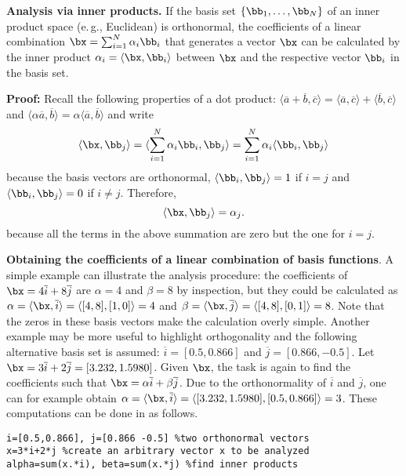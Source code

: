 \bTheorem \textbf{Analysis via inner products.\label{th:analysis_inner_prod}} If the basis set $\{\bb_1, \ldots, \bb_N \}$ of an inner product space (e.\,g., Euclidean) is orthonormal, the coefficients of a linear combination $\bx=\sum_{i=1}^N \alpha_i \bb_i$ that generates a vector $\bx$ can be calculated by the inner product $\alpha_i = \langle\bx,\bb_i\rangle$ between $\bx$ and the respective vector $\bb_i$ in the basis set.

\textbf{Proof:} Recall the following properties of a dot product: $\langle\overline a+\overline b , \overline c\rangle = \langle\overline a , \overline c\rangle + \langle\overline b , \overline c\rangle$ and $\langle\alpha \overline a ,\overline b\rangle = \alpha \langle\overline a ,\overline b\rangle$ and
write
\[
\langle\bx,\bb_j\rangle=\langle\sum_{i=1}^N \alpha_i \bb_i,\bb_j\rangle = \sum_{i=1}^N \alpha_i \langle\bb_i,\bb_j\rangle
\]
because the basis vectors are orthonormal, $\langle\bb_i,\bb_j\rangle=1$ if $i=j$ and $\langle\bb_i,\bb_j\rangle=0$ if $i \ne j$. Therefore,
\[
\langle\bx,\bb_j\rangle=\alpha_j.
\]
because all the terms in the above summation are zero but the one for $i=j$.\eTheorem


\bExample \textbf{Obtaining the coefficients of a linear combination of basis functions}.
\label{ex:linearCombinationCoefficients}
A simple example can illustrate the analysis procedure: the coefficients of $\bx=4 \overline i +8 \overline j$ are $\alpha=4$ and $\beta=8$ by inspection, but they could be calculated as
$\alpha = \langle\bx,\overline i\rangle = \langle[4,8],[1,0]\rangle=4$ and $\beta = \langle\bx,\overline j\rangle = \langle[4,8],[0,1]\rangle=8$. Note that the zeros in these basis vectors make the calculation overly simple. Another example may be more useful to highlight orthogonality and the following alternative basis set is assumed: $\overline i = [0.5,0.866]$ and $\overline j = [0.866,-0.5]$. Let $\bx=3\overline i+2\overline j=[3.232,1.5980]$. Given $\bx$, the task is again to find the coefficients such that $\bx=\alpha \overline i+ \beta \overline j$. Due to the orthonormality of $\overline i$ and $\overline j$, one can for example obtain $\alpha=\langle\bx,\overline i\rangle=\langle[3.232,1.5980],[0.5,0.866]\rangle=3$. These computations can be done in {\matlab} as follows.
\begin{lstlisting}
i=[0.5,0.866], j=[0.866 -0.5] %two orthonormal vectors
x=3*i+2*j %create an arbitrary vector x to be analyzed
alpha=sum(x.*i), beta=sum(x.*j) %find inner products
\end{lstlisting}

